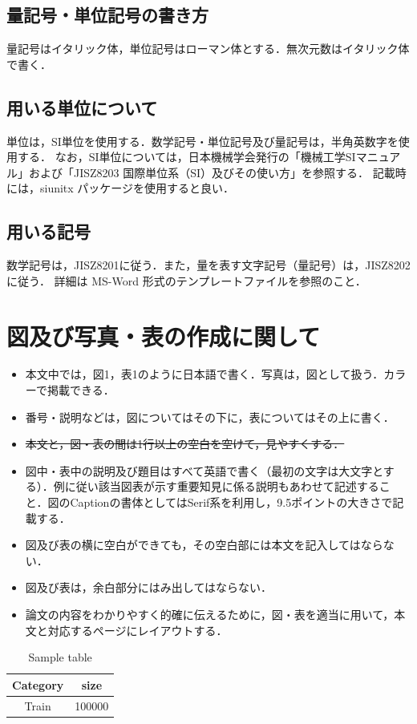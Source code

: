 \documentclass[year=2026]{sit}
\begin{document}
\subsection{量記号・単位記号の書き方}
量記号はイタリック体，単位記号はローマン体とする．無次元数はイタリック体で書く．

\subsection{用いる単位について}
単位は，SI単位を使用する．数学記号・単位記号及び量記号は，半角英数字を使用する．
なお，SI単位については，日本機械学会発行の「機械工学SIマニュアル」および「JISZ8203 国際単位系（SI）及びその使い方」を参照する．
記載時には，siunitx パッケージを使用すると良い．

\subsection{用いる記号}
数学記号は，JISZ8201に従う．また，量を表す文字記号（量記号）は，JISZ8202に従う．
詳細は MS-Word 形式のテンプレートファイルを参照のこと．


\section{図及び写真・表の作成に関して}\label{sec:figures_and_tables}
\begin{itemize}
  \item[（1）] 本文中では，図1，表1のように日本語で書く．写真は，図として扱う．カラーで掲載できる．
  \item[（2）] 番号・説明などは，図についてはその下に，表についてはその上に書く．
  \item[（3）] \sout{本文と，図・表の間は1行以上の空白を空けて，見やすくする．}
  \item[（4）] 図中・表中の説明及び題目はすべて英語で書く（最初の文字は大文字とする）．例に従い該当図表が示す重要知見に係る説明もあわせて記述すること．図のCaptionの書体としてはSerif系を利用し，9.5ポイントの大きさで記載する．
  \item[（5）] 図及び表の横に空白ができても，その空白部には本文を記入してはならない．
  \item[（6）] 図及び表は，余白部分にはみ出してはならない．
  \item[（7）] 論文の内容をわかりやすく的確に伝えるために，図・表を適当に用いて，本文と対応するページにレイアウトする．
\end{itemize}

\begin{table}[tb]
  \begin{center}
    \caption{Sample table}\label{tab:sample}
    \begin{tabular}{cc}
      \toprule
      Category & size\\
      \midrule
      Train & \num{100000}\\
      \bottomrule
    \end{tabular}
  \end{center}
\end{table}
\end{document}
